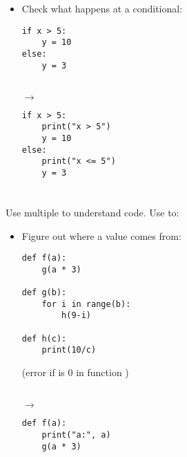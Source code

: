 \documentclass{handout}
\begin{document}
\begin{multicols}{2}
\begin{itemize}
\item Check what happens at a conditional: \\
\noindent
\begin{minipage}[t]{0.42\columnwidth}
\begin{lstlisting}
if x > 5:
    y = 10
else:
    y = 3
\end{lstlisting}
\end{minipage}
\begin{minipage}[t]{0.05\columnwidth}
\  \\
\hspace*{1ex}$\rightarrow$
\end{minipage}
\begin{minipage}[t]{0.42\columnwidth}
\begin{lstlisting}
if x > 5:
    print("x > 5")
    y = 10
else:
    print("x <= 5")
    y = 3
\end{lstlisting}
\end{minipage}


\end{itemize}

\section{}

Use multiple  to understand code. Use to:

\begin{itemize}

\item Figure out where a value comes from: \\
\noindent
\begin{minipage}[t]{0.42\columnwidth}
\begin{lstlisting}
def f(a):
    g(a * 3)

def g(b):
    for i in range(b):
        h(9-i)

def h(c):
    print(10/c)
\end{lstlisting}
(error if  is 0 in function )
\end{minipage}
\begin{minipage}[t]{0.05\columnwidth}
\  \\
\hspace*{1ex}$\rightarrow$
\end{minipage}
\begin{minipage}[t]{0.42\columnwidth}
\begin{lstlisting}
def f(a):
    print("a:", a)
    g(a * 3)


\end{lstlisting}
\end{minipage}
\end{itemize}
\end{multicols}
\end{document}
